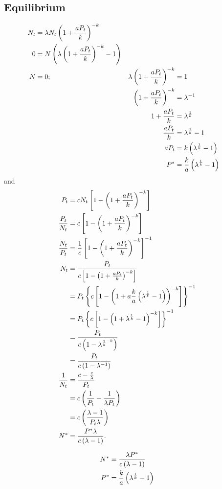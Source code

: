 \documentclass{article}
\begin{document}
\subsection{Equilibrium}
\begin{alignat*}{4}
    N_t &= \lambda N_t \left(1+\frac{aP_t}{k}\right)^{-k}\\
    0   &= N\left(\lambda\left(1+\frac{aP_t}{k}\right)^{-k} - 1\right)\\
    N   &= 0;
        & \lambda \left(1+\frac{aP_t}{k}\right)^{-k} &= 1\\
    &   &     \left(1+\frac{aP_t}{k}\right)^{-k}     &= \lambda^{-1}\\
    &   &     1+\frac{aP_t}{k}               &= \lambda^{\frac{1}{k}}\\
    &   &     \frac{aP_t}{k}                 &= \lambda^{\frac{1}{k}} -1\\
    &   &     aP_t                           &= k\left(\lambda^{\frac{1}{k}} - 1\right)\\
    &   &     P^*                            &= \frac{k}{a} \left(\lambda^{\frac{1}{k}} - 1\right)
\end{alignat*}
and
\begin{align*}
    P_t &= c N_t \left[1 - \left(1+\frac{aP_t}{k}\right)^{-k}\right]\\
    \frac{P_t}{N_t} &= c \left[1-\left(1+\frac{aP_t}{k}\right)^{-k}\right]\\
    \frac{N_t}{P_t} &= \frac{1}{c}\left[ 1 - \left(1+\frac{aP_t}{k}\right)^{-k} \right]^{-1}\\
    N_t &= \frac{P_t}{c\left[ 1 - \left(1+\frac{aP_t}{k}\right)^{-k} \right]}\\
    &= P_t \left\{c\left[ 1 - \left(1 + a \frac{k}{a}\left(\lambda^{\frac{1}{k}} - 1\right)\right)^{-k} \right]\right\}^{-1}\\
    &= P_t\left\{c \left[ 1 - \left(1 + \lambda^{\frac{1}{k}} - 1\right)^{-k} \right]\right\}^{-1}\\
    &= \frac{P_t}{c \left(1 - \lambda^{\frac{1}{k}^{-k}}\right)}\\
    &= \frac{P_t}{c \left(1-\lambda^{-1}\right)}\\
    \frac{1}{N_t} &= \frac{c - \frac{c}{\lambda}}{P_t}\\
    &= c \left(\frac{1}{P_t} -\frac{1}{\lambda P_t}\right)\\
    &= c \left(\frac{\lambda - 1}{P_t \lambda}\right)\\
    N^* &= \frac{P^*\lambda}{c\left(\lambda-1\right)}.
\end{align*}

\begin{align*}
    N^* &= \frac{\lambda P^*}{c\left(\lambda - 1\right)}\\
    P^* &= \frac{k}{a} \left(\lambda^{\frac{1}{k}} - 1\right)
\end{align*}
\end{document}

